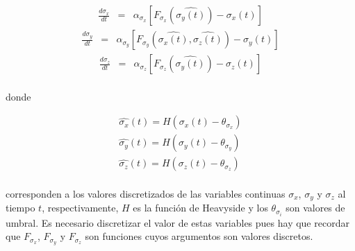 \begin{eqnarray}\label{glass1_3nodos}
\frac{d\sigma_x}{dt} & = & \alpha_{\sigma_x} [F_{\sigma_x}(\widehat{\sigma_y(t)}) - \sigma_x(t)]
\end{eqnarray}
\begin{eqnarray}\label{glass2_3nodos}
\frac{d\sigma_y}{dt} & = & \alpha_{\sigma_y} [F_{\sigma_y}(\widehat{\sigma_x(t)}, \widehat{\sigma_z(t)}) - \sigma_y(t)]
\end{eqnarray}
\begin{eqnarray}\label{glass3_3nodos}
\frac{d\sigma_z}{dt} & = & \alpha_{\sigma_z} [F_{\sigma_z}(\widehat{\sigma_y(t)}) - \sigma_z(t)]
\end{eqnarray}
\\
donde

\begin{eqnarray}
	\widehat{\sigma_x}(t) = H(\sigma_x(t) - \theta_{\sigma_x}) \\
	\widehat{\sigma_y}(t) = H(\sigma_y(t) - \theta_{\sigma_y}) \\
	\widehat{\sigma_z}(t) = H(\sigma_z(t) - \theta_{\sigma_z})
\end{eqnarray}
\\
corresponden a los valores discretizados de las variables continuas $\sigma_x$, $\sigma_y$ y $\sigma_z$ al tiempo $t$, respectivamente, $H$ es la función de Heavyside y los $\theta_{\sigma_i}$ son valores de umbral. Es necesario discretizar el valor de estas variables pues hay que recordar que $F_{\sigma_x}$, $F_{\sigma_y}$ y $F_{\sigma_z}$ son funciones cuyos argumentos son valores discretos.




%
%
%  

